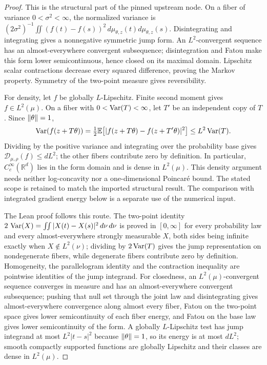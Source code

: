 \begin{proof}
  \leanok
  This is the structural part of the pinned upstream node. On a fiber of variance
  $0<\sigma^2<\infty$, the normalized variance is
  $(2\sigma^2)^{-1}\iint(f(t)-f(s))^2\,d\mu_{\theta,z}(t)d\mu_{\theta,z}(s)$.
  Disintegrating and integrating gives a nonnegative symmetric jump form. An $L^2$-convergent
  sequence has an almost-everywhere convergent subsequence; disintegration and Fatou make
  this form lower semicontinuous, hence closed on its maximal domain. Lipschitz scalar
  contractions decrease every squared difference, proving the Markov property.
  Symmetry of the two-point measure gives reversibility.

  For density, let $f$ be globally $L$-Lipschitz. Finite second moment gives $f\in L^2(\mu)$.
  On a fiber with $0<\operatorname{Var}(T)<\infty$, let $T'$ be an independent copy of $T$. Since
  $\lVert\theta\rVert=1$,
  \[
    \operatorname{Var}(f(z+T\theta))
      =\tfrac12\mathbb E\bigl[|f(z+T\theta)-f(z+T'\theta)|^2\bigr]
      \le L^2\operatorname{Var}(T).
  \]
  Dividing by the positive variance and integrating over the probability base gives
  $\mathcal D_{\mu,\rho}(f)\le dL^2$; the other fibers contribute zero by definition.
  In particular, $C_c^\infty(\mathbb R^d)$ lies in the form domain and is dense in $L^2(\mu)$.
  This density argument needs neither log-concavity nor a one-dimensional Poincar\'e bound.
  The stated scope is retained to match the imported structural result. The comparison with
  integrated gradient energy below is a separate use of the numerical input.

  The Lean proof follows this route.  The two-point identity
  $2\,\operatorname{Var}(X)=\iint|X(t)-X(s)|^2\,d\nu\,d\nu$ is proved in $[0,\infty]$ for every probability
  law and every almost-everywhere strongly measurable $X$, both sides being infinite exactly when
  $X\notin L^2(\nu)$; dividing by $2\operatorname{Var}(T)$ gives the jump representation on nondegenerate
  fibers, while degenerate fibers contribute zero by definition.  Homogeneity, the parallelogram
  identity and the contraction inequality are pointwise identities of the jump integrand.  For
  closedness, an $L^2(\mu)$-convergent sequence converges in measure and has an almost-everywhere
  convergent subsequence; pushing that null set through the joint law and disintegrating gives
  almost-everywhere convergence along almost every fiber, Fatou on the two-point space gives lower
  semicontinuity of each fiber energy, and Fatou on the base law gives lower semicontinuity of the
  form.  A globally $L$-Lipschitz test has jump integrand at most $L^2|t-s|^2$ because
  $\lVert\theta\rVert=1$, so its energy is at most $dL^2$; smooth compactly supported functions are
  globally Lipschitz and their classes are dense in $L^2(\mu)$.
\end{proof}

